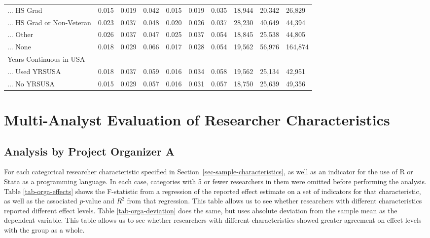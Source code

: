 \documentclass[
  letterpaper,
  DIV=11,
  numbers=noendperiod]{scrartcl}
\begin{document}
\begin{table}[!htbp]
{\begin{tabular}{llllllllll}
... HS Grad & 0.015 & 0.019 & 0.042 & 0.015 & 0.019 & 0.035 & 18,944 & 20,342 & 26,829 \\ 
... HS Grad or Non-Veteran & 0.023 & 0.037 & 0.048 & 0.020 & 0.026 & 0.037 & 28,230 & 40,649 & 44,394 \\ 
... Other & 0.026 & 0.037 & 0.047 & 0.025 & 0.037 & 0.054 & 18,845 & 25,538 & 44,805 \\ 
... None & 0.018 & 0.029 & 0.066 & 0.017 & 0.028 & 0.054 & 19,562 & 56,976 & 164,874 \\ 
Years Continuous in USA &  &  &  &  &  &  &  &  &  \\ 
... Used YRSUSA & 0.018 & 0.037 & 0.059 & 0.016 & 0.034 & 0.058 & 19,562 & 25,134 & 42,951 \\ 
... No YRSUSA & 0.015 & 0.029 & 0.057 & 0.016 & 0.031 & 0.057 & 18,750 & 25,639 & 49,356\\ 
\hline
\hline
\end{tabular}
}
\end{table}

\section*{Multi-Analyst Evaluation of Researcher
Characteristics}\label{multi-analyst-evaluation-of-researcher-characteristics}

\subsection{Analysis by Project Organizer
A}\label{analysis-by-project-organizer-a}

For each categorical researcher characteristic specified in
Section~\ref{sec-sample-characteristics}, as well as an indicator for
the use of R or Stata as a programming language. In each case,
categories with 5 or fewer researchers in them were omitted before
performing the analysis. Table \ref{tab-orga-effects} shows the
F-statistic from a regression of the reported effect estimate on a set
of indicators for that characteristic, as well as the associated
\(p\)-value and \(R^2\) from that regression. This table allows us to
see whether researchers with different characteristics reported
different effect levels. Table \ref{tab-orga-deviation} does the same,
but uses absolute deviation from the sample mean as the dependent
variable. This table allows us to see whether researchers with different
characteristics showed greater agreement on effect levels with the group
as a whole.
\end{document}
